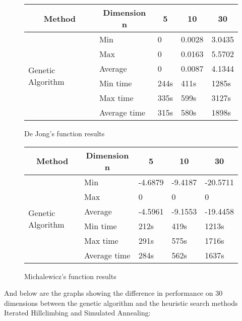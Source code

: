\documentclass{article}
\begin{document}
\begin{figure}[!h]
    \begin{tabular}{|l|l|l|l|l|}
        \hline
        \multicolumn{1}{|c|}{Method} & \multicolumn{1}{c|}{Dimension n} & \multicolumn{1}{c|}{5} & \multicolumn{1}{c|}{10} & \multicolumn{1}{c|}{30} \\ \hline
        \multirow{6}{*}{Genetic Algorithm} & Min & 0 & 0.0028 & 3.0435 \\ \cline{2-5} 
         & Max & 0 & 0.0163 & 5.5702 \\ \cline{2-5} 
         & Average & 0 & 0.0087 & 4.1344 \\ \cline{2-5} 
         & Min time & 244s & 411s & 1285s \\ \cline{2-5} 
         & Max time & 335s & 599s & 3127s \\ \cline{2-5} 
         & Average time & 315s & 580s & 1898s \\ \hline
    \end{tabular}
  \caption{De Jong's function results}
\end{figure}

\begin{figure}[!h]
        \begin{tabular}{|l|l|l|l|l|}
        \hline
        \multicolumn{1}{|c|}{Method} & \multicolumn{1}{c|}{Dimension n} & \multicolumn{1}{c|}{5} & \multicolumn{1}{c|}{10} & \multicolumn{1}{c|}{30} \\ \hline
        \multirow{6}{*}{Genetic Algorithm} & Min & -4.6879 & -9.4187 & -20.5711 \\ \cline{2-5} 
         & Max & 0 & 0 & 0 \\ \cline{2-5} 
         & Average & -4.5961 & -9.1553 & -19.4458 \\ \cline{2-5} 
         & Min time & 212s & 419s & 1213s \\ \cline{2-5} 
         & Max time & 291s & 575s & 1716s \\ \cline{2-5} 
         & Average time & 284s & 562s & 1637s \\ \hline
        \end{tabular}
  \caption{Michalewicz's function results}
\end{figure}

\newpage

And below are the graphs showing the difference in performance on 30 dimensions 
between the genetic algorithm and the heuristic search methods 
Iterated Hillclimbing and Simulated Annealing:
\end{document}
